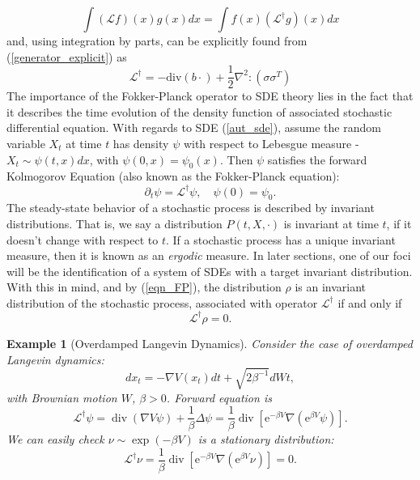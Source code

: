 \documentclass[11pt, twoside]{report}
\newtheorem{example}[theorem]{Example}
\begin{document}
\begin{equation}
    \int (\mathcal{L}f)(x)g(x) dx = \int f(x)(\mathcal{L}^{\dagger}g)(x) dx
\end{equation}
and, using integration by parts, can be explicitly found from (\ref{generator_explicit}) as
\begin{equation} \label{gen_dag_explicit}
    \mathcal{L}^{\dagger} = -\mathrm{div}(b\cdot) + \frac{1}{2} \nabla^2:(\sigma \sigma^T)
\end{equation}
The importance of the Fokker-Planck operator to SDE theory lies in the fact that it describes the time evolution of the density function of associated stochastic differential equation. With regards to SDE (\ref{aut_sde}), assume the random variable $X_t$ at time $t$ has density $\psi$ with respect to Lebesgue measure - $X_t \sim \psi(t,x) dx$, with $\psi(0,x) = \psi_0(x).$ Then $\psi$ satisfies the forward Kolmogorov Equation (also known as the Fokker-Planck equation):
\begin{equation} \label{eqn_FP}
    \partial_t \psi = \mathcal{L}^\dagger \psi, \quad \psi(0) = \psi_0.
\end{equation}
The steady-state behavior of a stochastic process is described by invariant distributions. That is, we say a distribution $P(t,X,\cdot)$ is invariant at time $t$, if it doesn't change with respect to $t$. If a stochastic process has a unique invariant measure, then it is known as an \textit{ergodic} measure. In later sections, one of our foci will be the identification of a system of SDEs with a target invariant distribution. With this in mind, and by (\ref{eqn_FP}), the distribution $\rho$ is an invariant distribution of the stochastic process, associated with operator $\mathcal{L}^{\dagger}$ if and only if
\begin{equation}\label{eqn_FP_inv}
    \mathcal{L}^{\dagger} \rho = 0.
\end{equation}


\begin{example}[Overdamped Langevin Dynamics]
Consider the case of overdamped Langevin dynamics:
\[dx_t = -\nabla V(x_t) dt + \sqrt{2\beta^{-1}}dWt,\]
with Brownian motion $W$, $\beta  > 0$.
    Forward equation is
    $$
\mathcal{L}^{\dagger} \psi=\operatorname{div}(\nabla V \psi)+\frac{1}{\beta} \Delta \psi=\frac{1}{\beta} \operatorname{div}\left[\mathrm{e}^{-\beta V} \nabla\left(\mathrm{e}^{\beta V} \psi\right)\right] .
$$
    We can easily check $\nu \sim \exp{(-\beta V)}$ is a stationary distribution:
    \[\mathcal{L}^{\dagger} \nu = \frac{1}{\beta} \operatorname{div}\left[\mathrm{e}^{-\beta V} \nabla\left(\mathrm{e}^{\beta V} \nu\right)\right] = 0.\]
\end{example}
\end{document}
